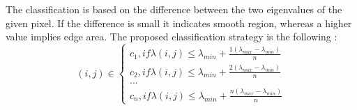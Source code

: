 \documentclass[draft,final]{vutinfth} %
\begin{document}
The classification is based on the difference between the two eigenvalues of the given pixel.
If the difference is small it indicates smooth region, whereas a higher value implies edge area.
The proposed classification strategy is the following \cite{zeng2011region}:
\[
(i, j)\in \left\{
                \begin{array}{ll}
                  c_1, if \lambda(i,j) \leq \lambda_{min} + \frac{1(\lambda_{max} - \lambda_{min})}{n}\\
                  c_2, if \lambda(i,j) \leq \lambda_{min} + \frac{2(\lambda_{max} - \lambda_{min})}{n}\\
				... \\
                   c_n, if \lambda(i,j) \leq \lambda_{min} + \frac{n(\lambda_{max} - \lambda_{min})}{n}
                \end{array}
              \right.
\]
\end{document}
